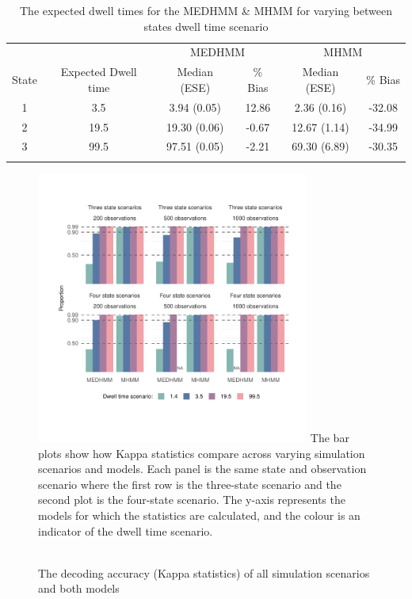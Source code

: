 \begin{table}
\caption{The expected dwell times for the MEDHMM \& MHMM for varying between states dwell time scenario}
\centering
\begin{tabular}{cccccc} 
\toprule
 &  & \multicolumn{2}{c}{MEDHMM} & \multicolumn{2}{c}{MHMM} \\ 
\cmidrule{1-2}\cmidrule(lr){3-4}\cmidrule(lr){5-6}
State & Expected Dwell time & Median (ESE) & \% Bias & Median (ESE) & \% Bias \\ 
\midrule
1 & 3.5 & 3.94 (0.05) & 12.86 & 2.36 (0.16) & -32.08 \\
2 & 19.5 & 19.30 (0.06) & -0.67& 12.67 (1.14) & -34.99 \\
3 & 99.5 & 97.51 (0.05) & -2.21 & 69.30 (6.89) & -30.35 \\
\bottomrule
\label{mix_table_exp_dwell}
\end{tabular}
\end{table}


\begin{figure}[h]
\caption{\\The decoding accuracy (Kappa statistics) of all simulation scenarios and both models}
    \centering
    \includegraphics[width=0.8\textwidth]{graphics/state_decoding_simulation.pdf}
    \flushleft
    \footnotesize
    \justifying
    The bar plots show how Kappa statistics compare across varying simulation scenarios and models. Each panel is the same state and observation scenario where the first row is the three-state scenario and the second plot is the four-state scenario. The y-axis represents the models for which the statistics are calculated, and the colour is an indicator of the dwell time scenario.   
    \label{decoding_kappa}
\end{figure}